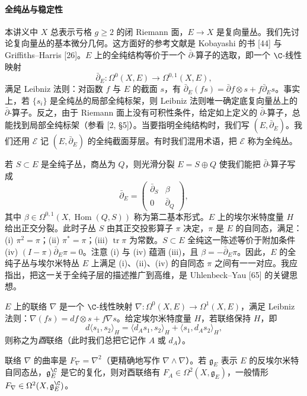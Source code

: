 \paragraph{全纯丛与稳定性} 本讲义中 $X$ 总表示亏格 $g\ge2$ 的闭 Riemann 面，$E\to X$ 是复向量丛。我们先讨论复向量丛的基本微分几何。这方面好的参考文献是 Kobayashi 的书 [44] 与 Griffiths--Harris [26]。$E$ 上的全纯结构等价于一个 $\bar\partial$-算子的选取，即一个 $\C$-线性映射
\[
\bar\partial_E\colon\Omega^0(X,E)\longrightarrow\Omega^{0,1}(X,E),
\]
满足 Leibniz 法则：对函数 $f$ 与 $E$ 的截面 $s$，有 $\bar\partial_E(fs)=\bar\partial f\otimes s+f\bar\partial_E s$。事实上，若 $\{s_i\}$ 是全纯丛的局部全纯标架，则 Leibniz 法则唯一确定底复向量丛上的 $\bar\partial$-算子。反之，由于 Riemann 面上没有可积性条件，给定如上定义的 $\bar\partial$-算子，总能找到局部全纯标架（参看 [2, \S5]）。当要指明全纯结构时，我们写 $(E,\bar\partial_E)$。我们还用 $\mathcal{E}$ 记 $(E,\bar\partial_E)$ 的全纯截面芽层。有时我们混用术语，把 $\mathcal{E}$ 称为全纯丛。

若 $S\subset E$ 是全纯子丛，商丛为 $Q$，则光滑分裂 $E=S\oplus Q$ 使我们能把 $\bar\partial$-算子写成
\begin{equation}
\bar\partial_E=\begin{pmatrix}\bar\partial_S & \beta\\ 0 & \bar\partial_Q\end{pmatrix},
\label{eq:4.1}\tag{4.1}
\end{equation}
其中 $\beta\in\Omega^{0,1}(X,\operatorname{Hom}(Q,S))$ 称为第二基本形式。$E$ 上的埃尔米特度量 $H$ 给出正交分裂。此时子丛 $S$ 由其正交投影算子 $\pi$ 决定，$\pi$ 是 $E$ 的自同态，满足：(i) $\pi^2=\pi$；(ii) $\pi^*=\pi$；(iii) $\operatorname{tr}\pi$ 为常数。$S\subset E$ 全纯这一陈述等价于附加条件 (iv) $(I-\pi)\bar\partial_E\pi=0$。注意 (i) 与 (iv) 蕴涵 (iii)，且 $\beta=-\bar\partial_E\pi$。因此，$E$ 的全纯子丛与埃尔米特丛 $E$ 上满足 (i)、(ii)、(iv) 的自同态 $\pi$ 之间有一一对应。我应指出，把这一关于全纯子层的描述推广到高维，是 Uhlenbeck--Yau [65] 的关键思想。

$E$ 上的联络 $\nabla$ 是一个 $\C$-线性映射 $\nabla\colon\Omega^0(X,E)\to\Omega^1(X,E)$，满足 Leibniz 法则：$\nabla(fs)=df\otimes s+f\nabla s$。给定埃尔米特度量 $H$，若联络保持 $H$，即
\begin{equation}
d\langle s_1,s_2\rangle_H=\langle d_As_1,s_2\rangle_H+\langle s_1,d_As_2\rangle_H,
\label{eq:4.2}\tag{4.2}
\end{equation}
则称之为\emph{酉}联络（此时我们总把它记作 $A$ 或 $d_A$）。

联络 $\nabla$ 的曲率是 $F_\nabla=\nabla^2$（更精确地写作 $\nabla\wedge\nabla$）。若 $\mathfrak{g}_E$ 表示 $E$ 的反埃尔米特自同态丛，$\mathfrak{g}^\C_E$ 是它的复化，则对酉联络有 $F_A\in\Omega^2(X,\mathfrak{g}_E)$，一般情形 $F_\nabla\in\Omega^2(X,\mathfrak{g}^\C_E)$。


